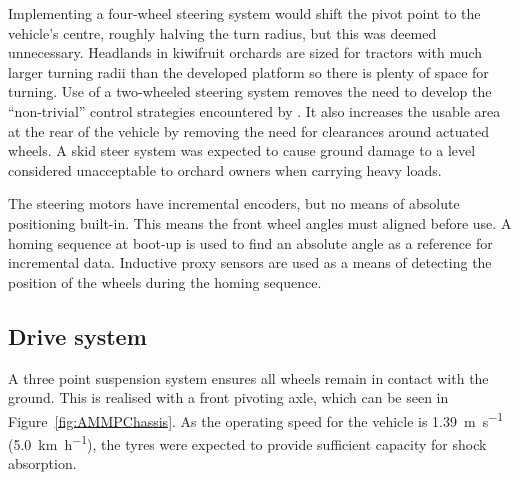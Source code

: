 \documentclass[preprint,authoryear,12pt]{elsarticle}
\begin{document}
        Implementing a four-wheel steering system would shift the pivot point to the vehicle's centre, roughly halving the turn radius, but this was deemed unnecessary.
        Headlands in kiwifruit orchards are sized for tractors with much larger turning radii than the developed platform so there is plenty of space for turning.
        Use of a two-wheeled steering system removes the need to develop the ``non-trivial'' control strategies encountered by \cite{Bak2004}.
        It also increases the usable area at the rear of the vehicle by removing the need for clearances around actuated wheels.
        A skid steer system was expected to cause ground damage to a level considered unacceptable to orchard owners when carrying heavy loads.

        The steering motors have incremental encoders, but no means of absolute positioning built-in.
        This means the front wheel angles must aligned before use.
        A homing sequence at boot-up is used to find an absolute angle as a reference for incremental data.
        Inductive proxy sensors are used as a means of detecting the position of the wheels during the homing sequence.

    \subsection{Drive system}
    \label{sub:drive}

        A three point suspension system ensures all wheels remain in contact with the ground.
        This is realised with a front pivoting axle, which can be seen in  Figure~\ref{fig:AMMPChassis}.
        As the operating speed for the vehicle is \SI{1.39}{\meter\per\second} (\SI{5.0}{\kilo\meter\per\hour}), the tyres were expected to provide sufficient capacity for shock absorption.
\end{document}
